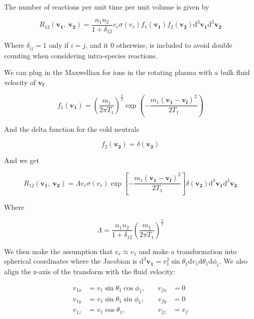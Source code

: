 \documentclass[11pt]{article}
\begin{document}
	
The number of reactions per unit time per unit volume is given by 

\begin{equation}
	R_{12} (\mathbf{v_1},\ \mathbf{v_2}) = \frac{n_1 n_2}{1 + \delta_{12}} v_r \sigma(v_r) f_1(\mathbf{v_1}) f_2(\mathbf{v_2}) \mathrm{d}^3 \mathbf{v_1} \mathrm{d}^3 \mathbf{v_2}
\end{equation}

Where $\delta_{ij} = 1$ only if $i = j$, and it 0 otherwise, is included to avoid double counting when considering intra-species reactions.

We can plug in the Maxwellian for ions in the rotating plasma with a bulk fluid velocity of $\mathbf{v_f}$

\begin{equation}
	f_1(\mathbf{v_1}) = \left( \frac{m_1}{2 \pi T_1} \right)^{\frac{3}{2}} \exp \left( -\frac{m_1 (\mathbf{v_1} - \mathbf{v_f})^2}{2 T_1} \right)  
\end{equation}

And the delta function for the cold neutrals

\begin{equation}
	f_2(\mathbf{v_2}) = \delta( \mathbf{v_2} )
\end{equation}

And we get 

\begin{equation}
	R_{12} (\mathbf{v_1},\ \mathbf{v_2}) = \Lambda v_r \sigma(v_r) \exp \left[ - \frac{m_1 (\mathbf{v_1} - \mathbf{v_f})^2}{2 T_1} \right] \delta( \mathbf{v_2} ) \mathrm{d}^3 \mathbf{v_1} \mathrm{d}^3 \mathbf{v_2}
\end{equation}

Where

\begin{equation}
	\Lambda = \frac{n_1 n_2}{1 + \delta_{12}} \left( \frac{m_1}{2 \pi T_1} \right)^{\frac{3}{2}} 
\end{equation}

We then make the assumption that $v_r \approx v_1$ and make a transformation into spherical coordinates where the Jacobian is $\mathrm{d}^3 \mathbf{v_1} = v_1^2 \sin \theta_1 \mathrm{d} v_1 \mathrm{d} \theta_1 \mathrm{d} \phi_1$. We also align the z-axis of the transform with the fluid velocity:

\begin{align*}
	v_{1x} &= v_1 \sin \theta_1 \cos \phi_1, \quad &v_{fx} &= 0 \\
	v_{1y} &= v_1 \sin \theta_1 \sin \phi_1, \quad &v_{fy} &= 0 \\
	v_{1z} &= v_1 \cos \theta_1, \quad &v_{fz} &= v_f
\end{align*}
\end{document}
